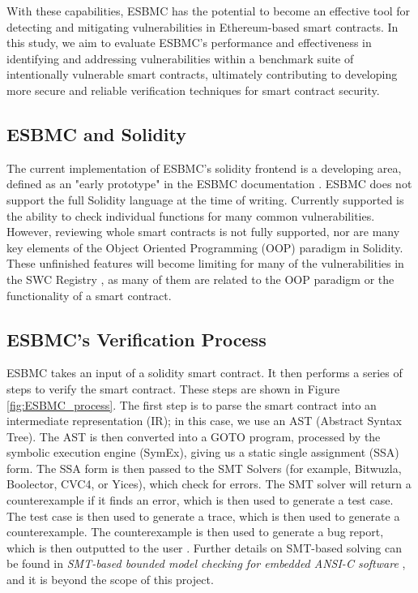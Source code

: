 With these capabilities, ESBMC has the potential to become an effective tool for detecting and mitigating vulnerabilities in Ethereum-based smart contracts. In this study, we aim to evaluate ESBMC's performance and effectiveness in identifying and addressing vulnerabilities within a benchmark suite of intentionally vulnerable smart contracts, ultimately contributing to developing more secure and reliable verification techniques for smart contract security.

\subsection{ESBMC and Solidity}

The current implementation of ESBMC's solidity frontend is a developing area, defined as an "early prototype" in the ESBMC documentation \cite{esbmc_doc}. ESBMC does not support the full Solidity language at the time of writing. Currently supported is the ability to check individual functions for many common vulnerabilities. However, reviewing whole smart contracts is not fully supported, nor are many key elements of the Object Oriented Programming (OOP) paradigm in Solidity. These unfinished features will become limiting for many of the vulnerabilities in the SWC Registry \cite{swc}, as many of them are related to the OOP paradigm or the functionality of a smart contract.

\subsection{ESBMC's Verification Process}

ESBMC takes an input of a solidity smart contract. It then performs a series of steps to verify the smart contract. These steps are shown in Figure \ref{fig:ESBMC_process}. The first step is to parse the smart contract into an intermediate representation (IR); in this case, we use an AST (Abstract Syntax Tree). The AST is then converted into a GOTO program, processed by the symbolic execution engine (SymEx), giving us a static single assignment (SSA) form. The SSA form is then passed to the SMT Solvers (for example, Bitwuzla, Boolector, CVC4, or Yices), which check for errors. The SMT solver will return a counterexample if it finds an error, which is then used to generate a test case. The test case is then used to generate a trace, which is then used to generate a counterexample. The counterexample is then used to generate a bug report, which is then outputted to the user \cite{song2022esbmc}. Further details on SMT-based solving can be found in \textit{SMT-based bounded model checking for embedded ANSI-C software} \cite{cordeiro2011smt}, and it is beyond the scope of this project.


